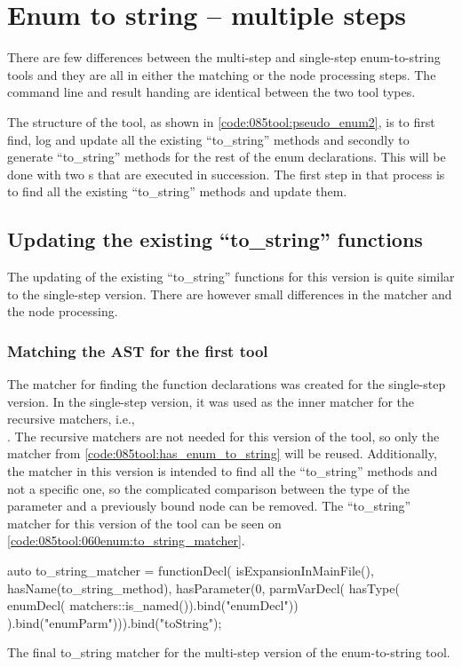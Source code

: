 \section{Enum to string -- multiple steps}

There are few differences between the multi-step and single-step enum-to-string tools and they are all in either the matching or the node processing steps. The command line and result handing are identical between the two tool types.

The structure of the tool, as shown in \cref{code:085tool:pseudo_enum2}, is to first find, log and update all the existing ``to\_string'' methods and secondly to generate ``to\_string'' methods for the rest of the enum declarations. This will be done with two s that are executed in succession. The first step in that process is to find all the existing ``to\_string'' methods and update them. 

\subsection{Updating the existing ``to\_string'' functions}

The updating of the existing ``to\_string'' functions for this version is quite similar to the single-step version. There are however small differences in the matcher and the node processing.

\subsubsection*{Matching the AST for the first tool}

The matcher for finding the function declarations was created for the single-step version. 
In the single-step version, it was used as the inner matcher for the recursive matchers, i.e., \\
. 
The recursive matchers are not needed for this version of the tool, so only the  matcher from \cref{code:085tool:has_enum_to_string} will be reused. 
Additionally, the matcher in this version is intended to find all the ``to\_string'' methods and not a specific one, so the complicated comparison between the type of the parameter and a previously bound node can be removed. 
The ``to\_string'' matcher for this version of the tool can be seen on \cref{code:085tool:060enum:to_string_matcher}.

\begin{listing}[H]
    \begin{cppcode}
auto to_string_matcher = functionDecl(
  isExpansionInMainFile(),
  hasName(to_string_method),
  hasParameter(0, 
    parmVarDecl(
	  hasType(
	    enumDecl(
            matchers::is_named()).bind("enumDecl"))
        ).bind("enumParm"))).bind("toString");
    \end{cppcode}
    \caption{The final to\_string matcher for the multi-step version of the enum-to-string tool.}
    \label{code:085tool:060enum:to_string_matcher}
\end{listing}

